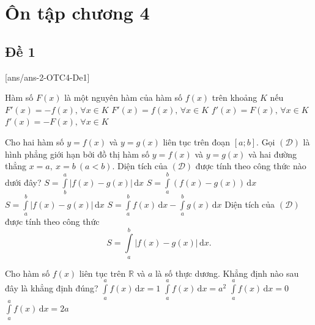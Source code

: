 \section{Ôn tập chương 4}
\subsection{Đề 1}
[ans/ans-2-OTC4-De1]
\caulc
\begin{ex}%
	Hàm số $F(x)$ là một nguyên hàm của hàm số $f(x)$ trên khoảng $K$ nếu
	\choice
	{$F'(x)=-f(x),\,\forall x \in K$}
	{\True $F'(x)=f(x),\,\forall x \in K$}
	{$f'(x)=F(x),\,\forall x \in K$}
	{$f'(x)=-F(x),\,\forall x \in K$}
\end{ex}

\begin{ex}%
	Cho hai hàm số $y=f(x)$ và $y=g(x)$ liên tục trên đoạn $[a;b]$. Gọi $(\mathscr{D})$ là hình phẳng giới hạn bởi đồ thị hàm số $y=f(x)$ và $y=g(x)$ và hai đường thẳng $x=a,~x=b~(a<b)$. Diện tích của $(\mathscr{D})$ được tính theo công thức nào dưới đây?
	\choice
	{$S=\displaystyle\int\limits_b^a \left| f(x)-g(x)\right|\mathrm{\,d}x$}
	{$S=\displaystyle\int\limits_a^b \left(f(x)-g(x)\right)\mathrm{\,d}x$}
	{\True $S=\displaystyle\int\limits_a^b \left| f(x)-g(x)\right|\mathrm{\,d}x$}
	{$S=\displaystyle\int\limits_a^b f(x)\mathrm{\,d}x-\displaystyle\int\limits_a^b g(x)\mathrm{\,d}x$}
	\loigiai
	{
		Diện tích của $(\mathscr{D})$  được tính theo công thức
		\[S=\displaystyle\int\limits_a^b \left| f(x)-g(x)\right|\mathrm{\,d}x.\]
	}
\end{ex}

\begin{ex}%
	Cho hàm số $f(x)$ liên tục trên $\mathbb{R}$ và $a$ là số thực dương. Khẳng định nào sau đây là khẳng định đúng?
	\choice
	{$\displaystyle\int\limits_a^a f(x) \mathrm{\,d}x=1$}
	{$\displaystyle\int\limits_a^af(x) \mathrm{\,d}x=a^2$}
	{\True $\displaystyle\int\limits_a^af(x) \mathrm{\,d}x=0$}
	{$\displaystyle\int\limits_a^a f(x) \mathrm{\,d}x=2a$}
\end{ex}

